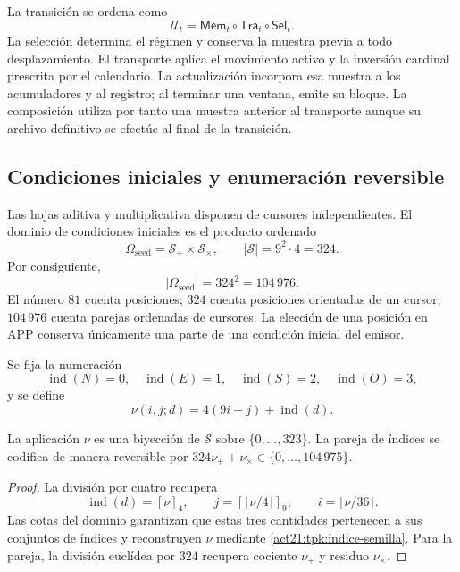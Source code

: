 La transición se ordena como
\begin{equation}
 \mathcal U_t=\mathsf{Mem}_t\circ\mathsf{Tra}_t\circ\mathsf{Sel}_t.
 \label{act21:tpk:composicion}
\end{equation}
La selección determina el régimen y conserva la muestra previa a todo
desplazamiento. El transporte aplica el movimiento activo y la inversión
cardinal prescrita por el calendario. La actualización incorpora esa muestra
a los acumuladores y al registro; al terminar una ventana, emite su bloque.
La composición utiliza por tanto una muestra anterior al transporte aunque
su archivo definitivo se efectúe al final de la transición.

\subsection{Condiciones iniciales y enumeración reversible}
\label{act21:tpk:semillas}

Las hojas aditiva y multiplicativa disponen de cursores independientes. El
dominio de condiciones iniciales es el producto ordenado
\[
 \Omega_{\mathrm{seed}}=\mathcal S_+\times\mathcal S_\times,
 \qquad |\mathcal S|=9^2\cdot4=324.
\]
Por consiguiente,
\begin{equation}
 |\Omega_{\mathrm{seed}}|=324^2=104\,976.
 \label{act21:tpk:censo-inicial}
\end{equation}
El número \(81\) cuenta posiciones; \(324\) cuenta posiciones orientadas
de un cursor; \(104\,976\) cuenta parejas ordenadas de cursores. La elección
de una posición en APP conserva únicamente una parte de una condición
inicial del emisor.

Se fija la numeración
\[
 \operatorname{ind}(N)=0,\quad\operatorname{ind}(E)=1,\quad
 \operatorname{ind}(S)=2,\quad\operatorname{ind}(O)=3,
\]
y se define
\begin{equation}
 \nu(i,j;d)=4(9i+j)+\operatorname{ind}(d).
 \label{act21:tpk:indice-semilla}
\end{equation}

\begin{proposition}
\label{act21:tpk:enumeracion}
La aplicación \(\nu\) es una biyección de \(\mathcal S\) sobre
\(\{0,\ldots,323\}\). La pareja de índices se codifica de manera reversible
por \(324\nu_++\nu_\times\in\{0,\ldots,104\,975\}\).
\end{proposition}
\begin{proof}
La división por cuatro recupera
\[
 \operatorname{ind}(d)=[\nu]_4,\qquad
 j=[\lfloor\nu/4\rfloor]_9,\qquad i=\lfloor\nu/36\rfloor.
\]
Las cotas del dominio garantizan que estas tres cantidades pertenecen a
sus conjuntos de índices y reconstruyen \(\nu\) mediante
\eqref{act21:tpk:indice-semilla}. Para la pareja, la división euclídea por
\(324\) recupera cociente \(\nu_+\) y residuo \(\nu_\times\).
\end{proof}

